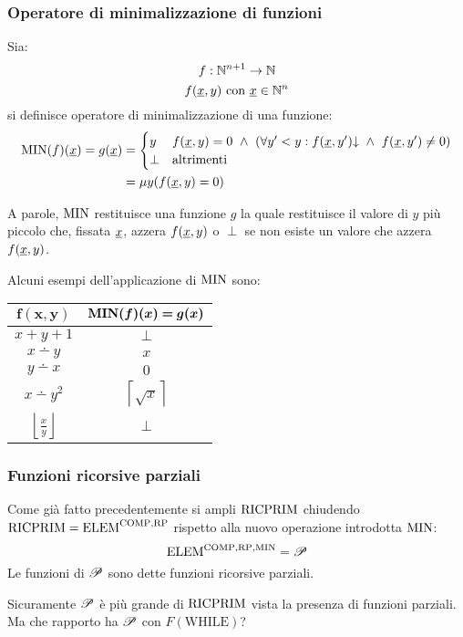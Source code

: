 \subsubsection*{Operatore di minimalizzazione di funzioni}
Sia:
$$ f:\mathbb{N}^{n+1}\to\mathbb{N} $$
$$ f(\text{\underline{$x$}},y)\text{ con }\text{\underline{$x$}}\in\mathbb{N}^n $$
si definisce operatore di minimalizzazione di una funzione:
$$ \begin{aligned}
    \MIN(f)(\sottolinea{x}) = g(\sottolinea{x}) &=
    \begin{cases}
    y & f(\sottolinea{x},y)=0\ \wedge \ (\forall y'<y:f(\sottolinea{x},y')\text{\textdownarrow}\ 
    \wedge \ f(\sottolinea{x},y')\neq0)\\
    \perp & \text{altrimenti}
    \end{cases}\\
    &= \mu y(f(\sottolinea{x},y)=0)
\end{aligned}$$

A parole, $\text{MIN}$ restituisce una funzione $g$ la quale restituisce il valore di $y$ più piccolo
che, fissata $\text{\underline{$x$}}$, azzera $f(\text{\underline{$x$}},y)$ o $\perp$ se non esiste un valore
che azzera $f(\text{\underline{$x$}},y)$.

Alcuni esempi dell'applicazione di $\text{MIN}$ sono:
\begin{center}
    \begin{tabular}{c|c}
        $\bm{f(x,y)}$ & $\bm{\textbf{\ensuremath{\text{MIN}}}(f)(x)=g(x)}$\\ \hline
        $x+y+1$ & $\perp$\\
        $x\dotminus y$ & $x$\\
        $y\dotminus x$ & $0$\\
        $x\dotminus y^2$ & $\left\lceil\sqrt{x}\right\rceil$\\
        $\left\lfloor\frac{x}{y}\right\rfloor$ & $\perp$\\
    \end{tabular}
\end{center}

\subsubsection{Funzioni ricorsive parziali}
Come già fatto precedentemente si ampli $\text{RICPRIM}$ chiudendo $\text{RICPRIM}=\text{ELEM}^{\text{COMP},\text{RP}}$
rispetto alla nuovo operazione introdotta $\text{MIN}$:
$$ \text{ELEM}^{\text{COMP},\text{RP},\text{MIN}} = \mathscr{P} $$
Le funzioni di $\mathscr{P}$ sono dette funzioni ricorsive parziali.

Sicuramente $\mathscr{P}$ è più grande di $\text{RICPRIM}$ vista la presenza di funzioni parziali. Ma che
rapporto ha $\mathscr{P}$ con $F(\text{WHILE})$?


